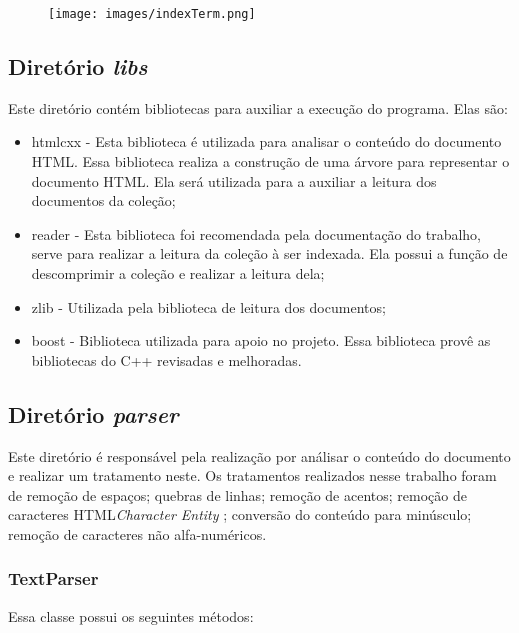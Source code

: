 \documentclass[12pt]{article}
\begin{document}
\begin{figure}[ht]
\centering
\texttt{[image: images/indexTerm.png]}
\label{fig:indexTerm}
\end{figure}


\subsection{Diretório \textit{libs}} \label{sssec:libs}

Este diretório contém bibliotecas para auxiliar a execução do programa. Elas são:

\begin{itemize}
\item htmlcxx - Esta biblioteca é utilizada para analisar o conteúdo do documento HTML. Essa biblioteca realiza a construção de uma árvore para representar o documento HTML. Ela será utilizada para a auxiliar a leitura dos documentos da coleção;
\item reader - Esta biblioteca foi recomendada pela documentação do trabalho, serve para realizar a leitura da coleção à ser indexada. Ela possui a função de descomprimir a coleção e realizar a leitura dela;
\item zlib - Utilizada pela biblioteca de leitura dos documentos;
\item boost - Biblioteca utilizada para apoio no projeto. Essa biblioteca provê as bibliotecas do C++ revisadas e melhoradas.
\end{itemize}

\subsection{Diretório \textit{parser}}

Este diretório é responsável pela realização por análisar o conteúdo do documento e realizar um tratamento neste. Os tratamentos realizados nesse trabalho foram de remoção de espaços; quebras de linhas; remoção de acentos; remoção de caracteres HTML\textit{Character Entity} \cite{htmlcharref2015}; conversão do conteúdo para minúsculo; remoção de caracteres não alfa-numéricos.

\subsubsection{TextParser}

Essa classe possui os seguintes métodos:
\end{document}
